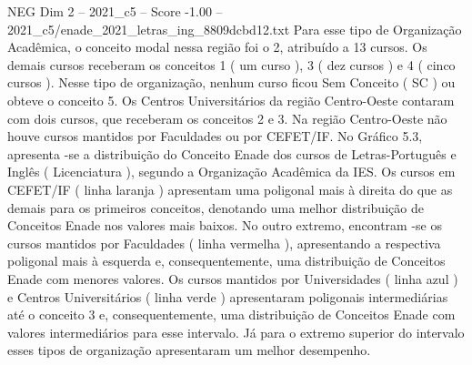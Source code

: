 \begin{textsample}{NEG Dim 2 – 2021\_c5 – Score -1.00 – 2021\_c5/enade\_2021\_letras\_ing\_8809dcbd12.txt}
Para esse tipo de Organização Acadêmica, o conceito modal nessa região foi o 2, atribuído a 13 cursos.
Os demais cursos receberam os conceitos 1 ( um curso ), 3 ( dez cursos ) e 4 ( cinco cursos ).
Nesse tipo de organização, nenhum curso ficou Sem Conceito ( SC ) ou obteve o conceito 5.
Os Centros Universitários da região Centro-Oeste contaram com dois cursos, que receberam os conceitos 2 e 3.
Na região Centro-Oeste não houve cursos mantidos por Faculdades ou por CEFET/IF.
No Gráfico 5.3, apresenta -se a distribuição do Conceito Enade dos cursos de Letras-Português e Inglês ( Licenciatura ), segundo a Organização Acadêmica da IES.
Os cursos em CEFET/IF ( linha laranja ) apresentam uma poligonal mais à direita do que as demais para os primeiros conceitos, denotando uma melhor distribuição de Conceitos Enade nos valores mais baixos.
No outro extremo, encontram -se os cursos mantidos por Faculdades ( linha vermelha ), apresentando a respectiva poligonal mais à esquerda e, consequentemente, uma distribuição de Conceitos Enade com menores valores.
Os cursos mantidos por Universidades ( linha azul ) e Centros Universitários ( linha verde ) apresentaram poligonais intermediárias até o conceito 3 e, consequentemente, uma distribuição de Conceitos Enade com valores intermediários para esse intervalo.
Já para o extremo superior do intervalo esses tipos de organização apresentaram um melhor desempenho.

\end{textsample}
